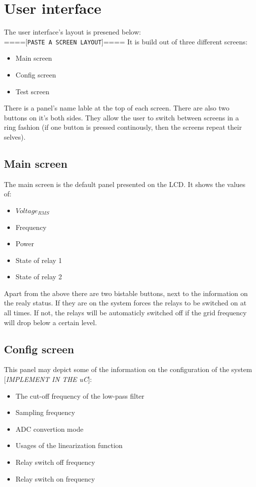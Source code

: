 \section{User interface}
The user interface's layout is presened below:\\
====[\texttt{PASTE A SCREEN LAYOUT}]====
It is build out of three different screens:
\begin{itemize}
\item Main screen
\item Config screen
\item Test screen
\end{itemize}
There is a panel's name lable at the top of each screen. There are also two buttons on it's both sides. They allow the user to switch between screens in a ring fashion (if one button is pressed continously, then the screens repeat their selves).\\

\subsection{Main screen}
The main screen is the default panel presented on the LCD. It shows the values of:
\begin{itemize}
\item $ Voltage_{RMS} $
\item Frequency
\item Power
\item State of relay 1
\item State of relay 2
\end{itemize}
Apart from the above there are two bistable buttons, next to the information on the realy status. If they are on the system forces the relays to be switched on at all times. If not, the relays will be automaticly  switched off if the grid frequency will drop below a certain level.

\subsection{Config screen}
This panel may depict some of the information on the configuration of the system [\emph{IMPLEMENT IN THE uC}]:
\begin{itemize}
\item The cut-off frequency of the low-pass filter
\item Sampling frequency
\item ADC convertion mode
\item Usages of the linearization function
\item Relay switch off frequency
\item Relay switch on frequency
\end{itemize}

